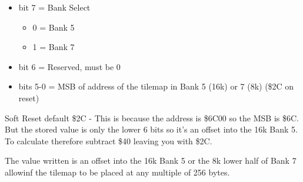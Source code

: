 \begin{itemize}
\item bit 7 = Bank Select
\begin{itemize}
\item[] 0 = Bank 5
\item[] 1 = Bank 7
\end{itemize}
\item bit 6 = Reserved, must be 0
\item bits 5-0 = MSB of address of the tilemap in Bank 5 (16k) or 7 (8k)
(\$2C on reset)
\end{itemize}
Soft Reset default \$2C - This is because the address is \$6C00 so the
MSB is \$6C. But the stored value is only the lower 6 bits so it's an
offset into the 16k Bank 5. To calculate therefore subtract \$40
leaving you with \$2C.

The value written is an offset into the 16k Bank 5 or the 8k lower
half of Bank 7 allowinf the tilemap to be placed at any multiple of
256 bytes.

